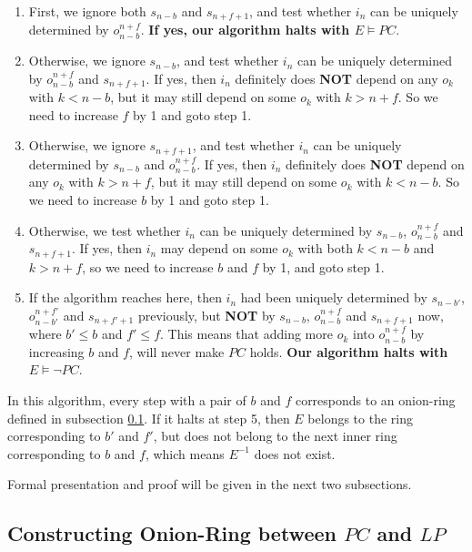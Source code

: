 \documentclass[journal]{IEEEtran}
\begin{document}
\begin{enumerate}
\item First,
we ignore both $s_{n-b}$ and $s_{n+f+1}$,
and test whether $i_n$ can be uniquely determined by $o_{n-b}^{n+f}$.
\textbf{If yes,
our algorithm halts with $E\vDash PC$}.

\item Otherwise,
we ignore $s_{n-b}$,
and test whether $i_n$ can be uniquely determined by $o_{n-b}^{n+f}$ and $s_{n+f+1}$.
If yes,
then $i_n$ definitely does \textbf{NOT} depend on any $o_k$ with $k<n-b$,
but it may still depend on some $o_k$ with $k>n+f$.
So we need to increase $f$ by 1 and goto step 1.

\item Otherwise,
we ignore $s_{n+f+1}$,
and test whether $i_n$ can be uniquely determined by $s_{n-b}$ and $o_{n-b}^{n+f}$.
If yes,
then $i_n$ definitely does \textbf{NOT} depend on any $o_k$ with $k>n+f$,
but it may still depend on some $o_k$ with $k<n-b$.
So we need to increase $b$ by 1 and goto step 1.

\item Otherwise,
we test whether $i_n$ can be uniquely determined by $s_{n-b}$, $o_{n-b}^{n+f}$ and $s_{n+f+1}$.
If yes,
then $i_n$ may depend on some $o_k$ with both $k<n-b$ and $k>n+f$,
so we need to increase $b$ and $f$ by 1,
and goto step 1.

\item If the algorithm reaches here,
then $i_n$ had been uniquely determined by $s_{n-b'}$, $o_{n-b'}^{n+f'}$ and $s_{n+f'+1}$ previously,
but \textbf{NOT} by $s_{n-b}$, $o_{n-b}^{n+f}$ and $s_{n+f+1}$ now,
where $b'\le b$ and $f'\le f$.
This means that adding more $o_k$ into $o_{n-b}^{n+f}$ by increasing $b$ and $f$, will never make $PC$ holds.
\textbf{Our algorithm halts with $E\vDash\neg PC$}.
\end{enumerate}

In this algorithm,
every step with a pair of $b$ and $f$ corresponds to an onion-ring defined in subsection \ref{subsec_onionring}.
If it halts at step 5,
then $E$ belongs to the ring corresponding to $b'$ and $f'$,
but does not belong to the next inner ring corresponding to $b$ and $f$,
which means $E^{-1}$ does not exist.

Formal presentation and proof will be given in the next two subsections.

\subsection{Constructing Onion-Ring between $PC$ and $LP$}\label{subsec_onionring}
\end{document}
